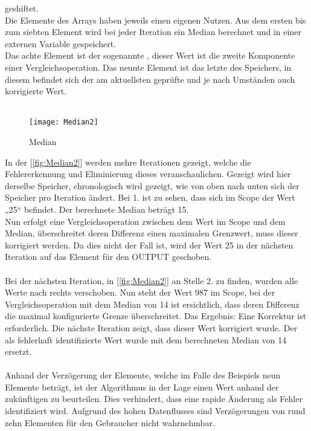 \documentclass[titlepage,12pt,twoside]{article}
\begin{document}
geshiftet. \\
Die Elemente des Arrays haben jeweils einen eigenen Nutzen. Aus dem ersten bis zum siebten Element wird bei jeder Iteration ein Median berechnet und in 
einer externen Variable gespeichert. \\
Das achte Element ist der sogenannte , dieser Wert ist die zweite Komponente einer Vergleichsoperation. Das neunte Element ist das letzte des 
Speichers, in diesem befindet sich der am aktuellsten geprüfte und je nach Umständen auch korrigierte Wert. \\
\\
\begin{figure}[H]
	\begin{center}
		\scalebox{0.8}
		{\texttt{[image: Median2]}}
		\caption{Median}
		\label{fig:Median2}		
	\end{center}
\end{figure}
\hfill \break
In der [\textcolor{blue}{\autoref{fig:Median2}}] werden mehre Iterationen gezeigt, welche die Fehlererkennung und Eliminierung dieses veranschaulichen. Gezeigt wird hier derselbe 
Speicher, chronologisch wird gezeigt, wie von oben nach unten sich der Speicher pro Iteration ändert. Bei 1. ist zu sehen, dass sich im Scope der Wert 
„25“ befindet. Der berechnete Median beträgt 15. \\
Nun erfolgt eine Vergleichsoperation zwischen dem Wert im Scope und dem Median, überschreitet deren Differenz einen maximalen Grenzwert, muss dieser 
korrigiert werden. Da dies nicht der Fall ist, wird der Wert 25 in der nächsten Iteration auf das Element für den OUTPUT geschoben. \\
\\
Bei der nächsten Iteration, in [\textcolor{blue}{\autoref{fig:Median2}}] an Stelle 2. zu finden, wurden alle Werte nach rechts verschoben. Nun steht der Wert 987 im Scope, bei der 
Vergleichsoperation mit dem Median von 14 ist ersichtlich, dass deren Differenz die maximal konfigurierte Grenze überschreitet. Das Ergebnis: Eine 
Korrektur ist erforderlich. Die nächste Iteration zeigt, dass dieser Wert korrigiert wurde. Der als fehlerhaft identifizierte Wert wurde mit dem 
berechneten Median von 14 ersetzt. \\ 
\\
Anhand der Verzögerung der Elemente, welche im Falle des Beispiels neun Elemente beträgt, ist der Algorithmus in der Lage einen Wert anhand der zukünftigen zu beurteilen. 
Dies verhindert, dass eine rapide Änderung als Fehler identifiziert wird. Aufgrund des hohen Datenflusses sind Verzögerungen von rund zehn Elementen für 
den Gebraucher nicht wahrnehmbar. \\
\\
\newpage
\end{document}
